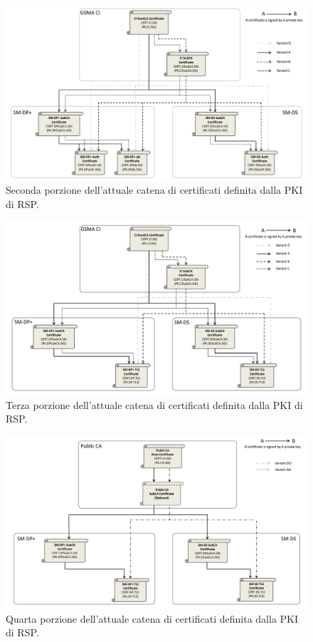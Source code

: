 \documentclass[10pt, oneside]{book}
\begin{document}
\begin{figure}
\includegraphics[width=\linewidth]{cert-chain-new2.png}
\caption{Seconda porzione dell'attuale catena di certificati definita dalla PKI di RSP.}
\label{fig:cert-chain-new2}
\end{figure}
\begin{figure}
\includegraphics[width=\linewidth]{cert-chain-new3.png}
\caption{Terza porzione dell'attuale catena di certificati definita dalla PKI di RSP.}
\label{fig:cert-chain-new3}
\end{figure}
\begin{figure}
\includegraphics[width=\linewidth]{cert-chain-new4.png}
\caption{Quarta porzione dell'attuale catena di certificati definita dalla PKI di RSP.}
\label{fig:cert-chain-new4}
\end{figure}
\end{document}
